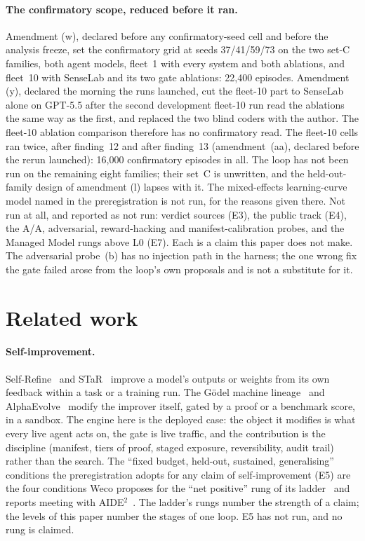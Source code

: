 \documentclass[11pt]{article}
\begin{document}
\paragraph{The confirmatory scope, reduced before it ran.} Amendment (w), declared before any
confirmatory-seed cell and before the analysis freeze, set the confirmatory grid at seeds
37/41/59/73 on the two set-C families, both agent models, fleet~1 with every system and both
ablations, and fleet~10 with SenseLab and its two gate ablations: 22,400 episodes. Amendment
(y), declared the morning the runs launched, cut the fleet-10 part to SenseLab alone on GPT-5.5
after the second development fleet-10 run read the ablations the same way as the first, and
replaced the two blind coders with the author. The fleet-10 ablation comparison therefore has no
confirmatory read. The fleet-10 cells ran twice, after finding~12 and after finding~13
(amendment~(aa), declared before the rerun launched): 16,000 confirmatory episodes in all. The
loop has not been run on the remaining eight families; their set~C is unwritten, and the
held-out-family design of amendment (l) lapses with it. The mixed-effects learning-curve model
named in the preregistration is not run, for the reasons given there. Not run at all, and
reported as not run: verdict sources (E3), the public track (E4), the A/A, adversarial,
reward-hacking and manifest-calibration probes, and the Managed Model rungs above L0 (E7). Each
is a claim this paper does not make. The adversarial probe~(b) has no injection path in the
harness; the one wrong fix the gate failed arose from the loop's own proposals and is not a
substitute for it.

\section{Related work}

\paragraph{Self-improvement.} Self-Refine~\cite{selfrefine} and STaR~\cite{star} improve a
model's outputs or weights from its own feedback within a task or a training run. The Gödel
machine lineage~\cite{godel,dgm} and AlphaEvolve~\cite{alphaevolve} modify the improver itself,
gated by a proof or a benchmark score, in a sandbox. The engine here is the deployed case: the
object it modifies is what every live agent acts on, the gate is live traffic, and the
contribution is the discipline (manifest, tiers of proof, staged exposure, reversibility, audit
trail) rather than the search. The ``fixed budget, held-out, sustained, generalising'' conditions
the preregistration adopts for any claim of self-improvement (E5) are the four conditions Weco
proposes for the ``net positive'' rung of its ladder~\cite{weco-ladder} and reports meeting with
AIDE$^2$~\cite{weco-aide2}. The ladder's rungs number the strength of a claim; the levels of this
paper number the stages of one loop. E5 has not run, and no rung is claimed.
\end{document}

